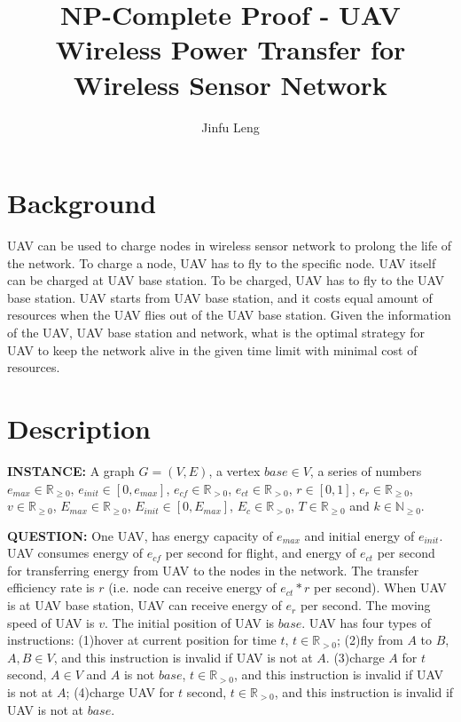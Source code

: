 \documentclass[11pt]{article}
\begin{document}
\title{NP-Complete Proof - UAV Wireless Power Transfer for Wireless Sensor Network}
\author{Jinfu Leng}
\maketitle
\section{Background}
UAV can be used to charge nodes in wireless sensor network to prolong the life of the network. To charge a node, UAV has to fly to the specific node. UAV itself can be charged at UAV base station. To be charged, UAV has to fly to the UAV base station. UAV starts from UAV base station, and it costs equal amount of resources when the UAV flies out of the UAV base station. Given the information of the UAV, UAV base station and network, what is the optimal strategy for UAV to keep the network alive in the given time limit with minimal cost of resources.

\section{Description}
\noindent
\textbf{INSTANCE:} 
A graph $G = (V, E)$, a vertex $base \in V$, a series of numbers $e_{max} \in \mathbb{R}_{\geq0}$, $e_{init} \in [0, e_{max}]$, $e_{cf} \in \mathbb{R}_{>0}$, $e_{ct} \in \mathbb{R}_{>0}$, $r \in [0, 1]$, $e_r \in \mathbb{R}_{\geq0}$, $v \in \mathbb{R}_{\geq0}$, $E_{max} \in \mathbb{R}_{\geq0}$, $E_{init} \in [0, E_{max}]$, $E_{c} \in \mathbb{R}_{>0}$, $T \in \mathbb{R}_{\geq0}$ and $k \in \mathbb{N}_{\geq0}$.

\noindent
\textbf{QUESTION:} 
One UAV, has energy capacity of $e_{max}$ and initial energy of $e_{init}$. UAV consumes energy of $e_{cf}$ per second for flight, and energy of $e_{ct}$ per second for transferring energy from UAV to the nodes in the network. The transfer efficiency rate is $r$ (i.e. node can receive energy of $e_{ct}*r$ per second). When UAV is at UAV base station, UAV can receive energy of $e_r$ per second. The moving speed of UAV is $v$. The initial position of UAV is $base$. UAV has four types of instructions: (1)hover at current position for time $t$, $t \in \mathbb{R}_{>0}$; (2)fly from $A$ to $B$, $A,B \in V$, and this instruction is invalid if UAV is not at $A$. (3)charge $A$ for $t$ second, $A \in V$ and $A$ is not $base$, $t \in \mathbb{R}_{>0}$, and this instruction is invalid if UAV is not at $A$; (4)charge UAV for $t$ second, $t \in \mathbb{R}_{>0}$, and this instruction is invalid if UAV is not at $base$.
\end{document}
